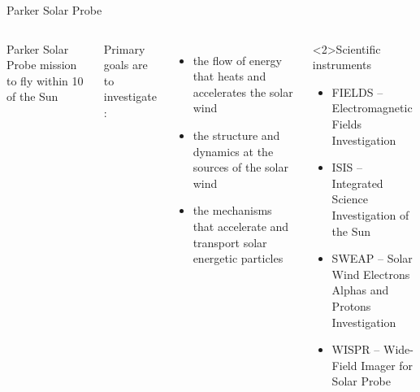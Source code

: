 \begin{frame}[plain,c]{Parker Solar Probe}{}
	\begin{columns}[c]
	\column{\textwidth}
		
		Parker Solar Probe mission to fly within 10\,\Rs{} of the Sun\\\ 
		
		Primary goals are to investigate \citep{Fox2015}:
		\begin{itemize}
			\item the flow of energy that heats and accelerates the solar wind
			\item the structure and dynamics at the sources of the solar wind
			\item the mechanisms that accelerate and transport solar energetic particles
		\end{itemize}
		\vspace{5mm}
		\begin{block}<2>{Scientific instruments}
			\begin{itemize}
				\item FIELDS -- Electromagnetic Fields Investigation
				\item IS\sun{}IS -- Integrated Science Investigation of the Sun
				\item SWEAP -- Solar Wind Electrons Alphas and Protons Investigation
				\item WISPR -- Wide-Field Imager for Solar Probe
			\end{itemize}
		\end{block}

	\end{columns}
\end{frame}
